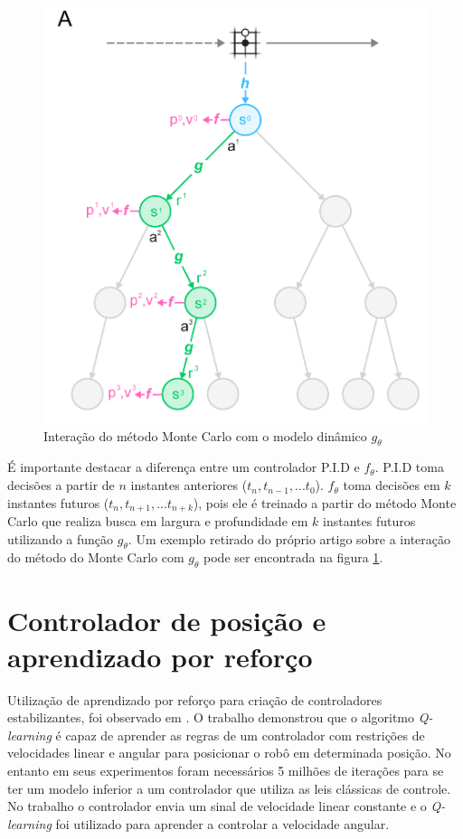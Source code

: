 \begin{figure}[H]
    \centering
    \includegraphics[scale=0.15]{figuras/monte_carlo.png}
    \caption{Interação do método Monte Carlo com o modelo dinâmico $g_{\theta}$}
    \label{fig:iteracao:metodo:monte:carlo}
\end{figure}

É importante destacar a diferença entre um controlador P.I.D
e $f_{\theta}$. P.I.D toma decisões a partir de $n$ instantes anteriores ($t_n,t_{n-1},...t_{0}$).
$f_{\theta}$ toma decisões em $k$ instantes futuros ($t_n,t_{n+1},...t_{n+k}$), pois ele é treinado
a partir do método Monte Carlo que realiza busca em largura e profundidade em $k$ instantes futuros
utilizando a função $g_{\theta}$. Um exemplo retirado do próprio artigo sobre a interação do método do Monte Carlo com $g_{\theta}$
pode ser encontrada na figura \ref{fig:iteracao:metodo:monte:carlo}. 

\section{Controlador de posição e aprendizado por reforço }
\label{sec:controlador:posicao:aprendizado:reforco}
Utilização de aprendizado por reforço para criação de controladores
estabilizantes, foi observado em \cite{farias2020position}.
O trabalho demonstrou que o algoritmo \textit{Q-learning} é capaz de aprender
as regras de um controlador com restrições de velocidades linear e angular
para  posicionar o robô em determinada posição. No entanto em seus
experimentos foram necessários 5 milhões de iterações para se ter um modelo
inferior a um controlador que utiliza as leis clássicas de controle.
No trabalho o controlador envia um sinal de velocidade linear
constante e o \textit{Q-learning} foi utilizado para aprender a
controlar a velocidade angular.

